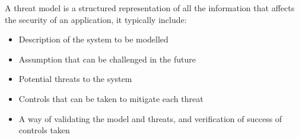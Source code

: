     A threat model is a structured representation of all the information that affects the security of an application, it typically include:
    \begin{itemize}
        \item Description of the system to be modelled 
        \item Assumption that can be challenged in the future 
        \item Potential threats to the system
        \item Controls that can be taken to mitigate each threat
        \item A way of validating the model and threats, and verification of success of controls taken
    \end{itemize}   
    
    